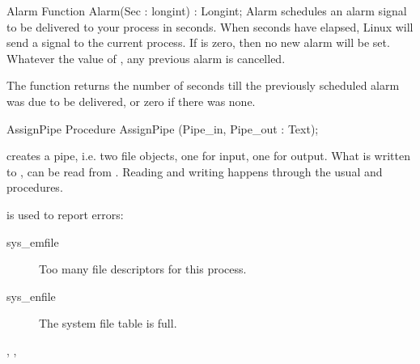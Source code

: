 
\begin{function}{Alarm}
\Declaration
Function Alarm(Sec : longint) : Longint;
\Description
Alarm schedules an alarm signal to be delivered to your process in 
seconds. When  seconds have elapsed, Linux will send a 
signal to the current process.  If  is zero, then no new alarm will
be set. Whatever the value of , any previous alarm is cancelled.

The function returns the number of seconds till the previously scheduled
alarm was due to be delivered, or zero if there was none.
\end{function}


\begin{procedure}{AssignPipe}
\Declaration
Procedure AssignPipe (Pipe\_in, Pipe\_out : Text);

\Description
{} creates a pipe, i.e. two file objects, one for input, one for output.
What is written to , can be read from .
Reading and writing happens through the usual  and
 procedures.

\Errors
  is used to report errors:
\begin{description}
\item[sys\_emfile] Too many file descriptors for this process.
\item[sys\_enfile] The system file table is full.
\end{description}

\SeeAlso
{}, , 
\end{procedure}
